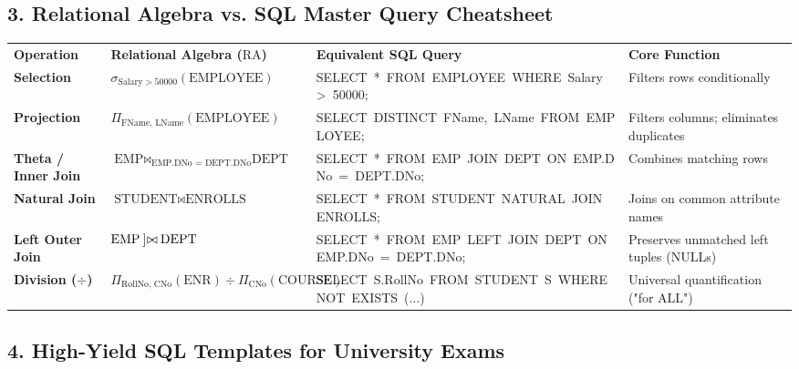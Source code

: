 \documentclass[10pt,a4paper]{article}
\newcommand{\ic}[1]{\mbox{\colorbox{AnthCodeBG}{\footnotesize\ttfamily\textcolor{AnthBlue}{#1}}}}
\newcommand{\LeftJoin}{\mathbin{]\mkern-4mu\bowtie}}
\begin{document}
\subsection{3. Relational Algebra vs. SQL Master Query Cheatsheet}

\begin{center}
\scriptsize
\begin{tabularx}{\textwidth}{L{2.2cm} L{3.6cm} L{4.5cm} X}
  \color{white}\textbf{Operation} & \color{white}\textbf{Relational Algebra ($\text{RA}$)} & \color{white}\textbf{Equivalent SQL Query} & \color{white}\textbf{Core Function} \\
   \textbf{Selection} & $\sigma_{\text{Salary} > 50000}(\text{EMPLOYEE})$ & \ic{SELECT * FROM EMPLOYEE WHERE Salary > 50000;} & Filters rows conditionally \\
  \textbf{Projection} & $\Pi_{\text{FName, LName}}(\text{EMPLOYEE})$ & \ic{SELECT DISTINCT FName, LName FROM EMPLOYEE;} & Filters columns; eliminates duplicates \\
   \textbf{Theta / Inner Join} & $\text{EMP} \bowtie_{\text{EMP.DNo = DEPT.DNo}} \text{DEPT}$ & \ic{SELECT * FROM EMP JOIN DEPT ON EMP.DNo = DEPT.DNo;} & Combines matching rows \\
  \textbf{Natural Join} & $\text{STUDENT} \bowtie \text{ENROLLS}$ & \ic{SELECT * FROM STUDENT NATURAL JOIN ENROLLS;} & Joins on common attribute names \\
   \textbf{Left Outer Join} & $\text{EMP} \LeftJoin \text{DEPT}$ & \ic{SELECT * FROM EMP LEFT JOIN DEPT ON EMP.DNo = DEPT.DNo;} & Preserves unmatched left tuples (NULLs) \\
  \textbf{Division ($\div$)} & $\Pi_{\text{RollNo, CNo}}(\text{ENR}) \div \Pi_{\text{CNo}}(\text{COURSE})$ & \ic{SELECT S.RollNo FROM STUDENT S WHERE NOT EXISTS (...)} & Universal quantification ("for ALL") \\
\end{tabularx}
\end{center}

\subsection{4. High-Yield SQL Templates for University Exams}
\end{document}
